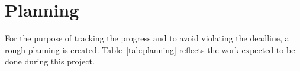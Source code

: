\section{Planning} \label{planning}
For the purpose of tracking the progress and to avoid violating the deadline, a rough planning is created. Table~\ref{tab:planning} reflects the work expected to be done during this project. 




